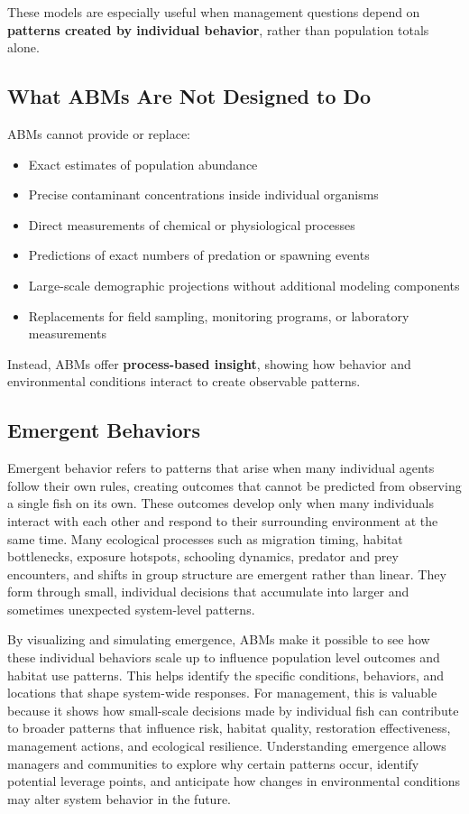\documentclass[
]{book}
\begin{document}
These models are especially useful when management questions depend on \textbf{patterns created by individual behavior}, rather than population totals alone.

\subsection{What ABMs Are Not Designed to Do}\label{what-abms-are-not-designed-to-do}

ABMs cannot provide or replace:

\begin{itemize}
\item
  Exact estimates of population abundance
\item
  Precise contaminant concentrations inside individual organisms
\item
  Direct measurements of chemical or physiological processes
\item
  Predictions of exact numbers of predation or spawning events
\item
  Large-scale demographic projections without additional modeling components
\item
  Replacements for field sampling, monitoring programs, or laboratory measurements
\end{itemize}

Instead, ABMs offer \textbf{process-based insight}, showing how behavior and environmental conditions interact to create observable patterns.

\subsection{Emergent Behaviors}\label{emergent-behaviors}

Emergent behavior refers to patterns that arise when many individual agents follow their own rules, creating outcomes that cannot be predicted from observing a single fish on its own. These outcomes develop only when many individuals interact with each other and respond to their surrounding environment at the same time. Many ecological processes such as migration timing, habitat bottlenecks, exposure hotspots, schooling dynamics, predator and prey encounters, and shifts in group structure are emergent rather than linear. They form through small, individual decisions that accumulate into larger and sometimes unexpected system-level patterns.

By visualizing and simulating emergence, ABMs make it possible to see how these individual behaviors scale up to influence population level outcomes and habitat use patterns. This helps identify the specific conditions, behaviors, and locations that shape system-wide responses. For management, this is valuable because it shows how small-scale decisions made by individual fish can contribute to broader patterns that influence risk, habitat quality, restoration effectiveness, management actions, and ecological resilience. Understanding emergence allows managers and communities to explore why certain patterns occur, identify potential leverage points, and anticipate how changes in environmental conditions may alter system behavior in the future.
\end{document}
